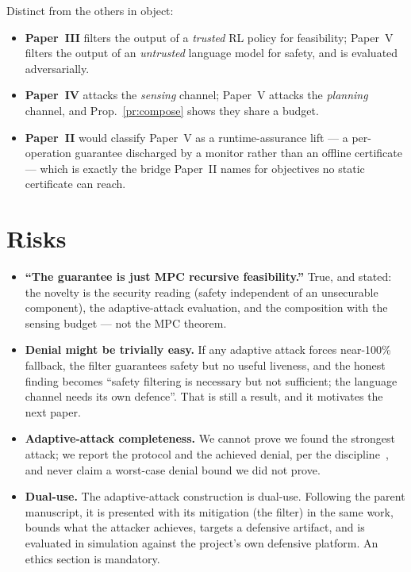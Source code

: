 \documentclass[11pt,a4paper]{article}
\begin{document}
\noindent Distinct from the others in object:
\begin{itemize}
\item \textbf{Paper~III} filters the output of a \emph{trusted} RL policy for
  feasibility; Paper~V filters the output of an \emph{untrusted} language model
  for safety, and is evaluated adversarially.
\item \textbf{Paper~IV} attacks the \emph{sensing} channel; Paper~V attacks the
  \emph{planning} channel, and Prop.~\ref{pr:compose} shows they share a budget.
\item \textbf{Paper~II} would classify Paper~V as a runtime-assurance lift ---
  a per-operation guarantee discharged by a monitor rather than an offline
  certificate --- which is exactly the bridge Paper~II names for objectives no
  static certificate can reach.
\end{itemize}

\section{Risks}
\begin{itemize}
\item \textbf{``The guarantee is just MPC recursive feasibility.''} True, and
  stated: the novelty is the security reading (safety independent of an
  unsecurable component), the adaptive-attack evaluation, and the composition
  with the sensing budget --- not the MPC theorem.
\item \textbf{Denial might be trivially easy.} If any adaptive attack forces
  near-100\% fallback, the filter guarantees safety but no useful liveness, and
  the honest finding becomes ``safety filtering is necessary but not sufficient;
  the language channel needs its own defence''. That is still a result, and it
  motivates the next paper.
\item \textbf{Adaptive-attack completeness.} We cannot prove we found the
  strongest attack; we report the protocol and the achieved denial, per the
  discipline~\cite{tramer2020adaptive}, and never claim a worst-case denial
  bound we did not prove.
\item \textbf{Dual-use.} The adaptive-attack construction is dual-use. Following
  the parent manuscript, it is presented with its mitigation (the filter) in the
  same work, bounds what the attacker achieves, targets a defensive artifact, and
  is evaluated in simulation against the project's own defensive platform. An
  ethics section is mandatory.
\end{itemize}
\end{document}
